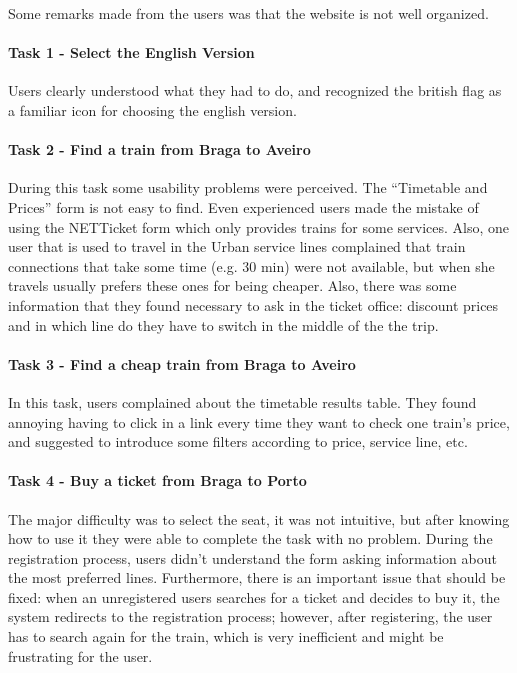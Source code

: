 \documentclass[a4paper]{article}
\begin{document}
Some remarks made from the users was that the website is not well organized.

\paragraph{Task 1 - Select the English Version} Users clearly understood what they had to do, and recognized the british flag as a familiar icon for choosing the english version.

\paragraph{Task 2 - Find a train from Braga to Aveiro} During this task some usability problems were perceived. The ``Timetable and Prices'' form is not easy to find. Even experienced users made the mistake of using the NETTicket form which only provides trains for some services. Also, one user that is used to travel in the Urban service lines complained that train connections that take some time (e.g. 30 min) were not available, but when she travels usually prefers these ones for being cheaper. Also, there was some information that they found necessary to ask in the ticket office: discount prices and in which line do they have to switch in the middle of the the trip.

\paragraph{Task 3 - Find a cheap train from Braga to Aveiro} In this task, users complained about the timetable results table. They found annoying having to click in a link every time they want to check one train's price, and suggested to introduce some filters according to price, service line, etc.
 
\paragraph{Task 4 - Buy a ticket from Braga to Porto} The major difficulty was to select the seat, it was not intuitive, but after knowing how to use it they were able to complete the task with no problem. During the registration process, users didn't understand the form asking information about the most preferred lines. Furthermore, there is an important issue that should be fixed: when an unregistered users searches for a ticket and decides to buy it, the system redirects to the registration process; however, after registering, the user has to search again for the train, which is very inefficient and might be frustrating for the user.
\end{document}
